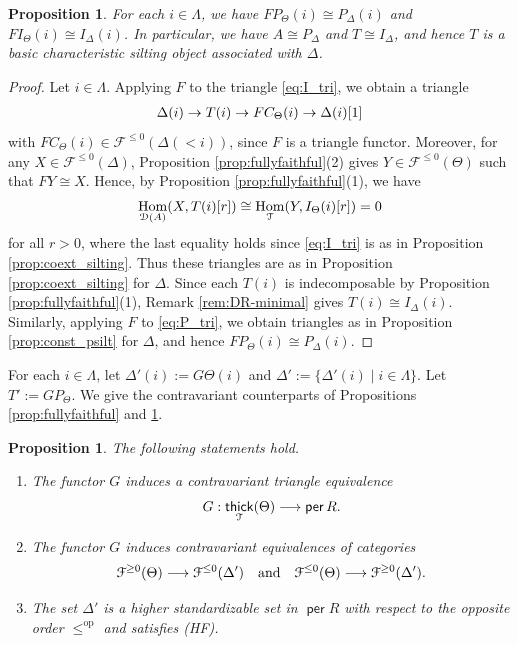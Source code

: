\documentclass[a4paper,reqno,11pt]{amsart}
\numberwithin{equation}{section}
\newtheorem{proposition}[theorem]{Proposition}
\theoremstyle{definition}
\newcommand{\D}{\mathcal{D}}
\newcommand{\F}{\mathcal{F}}
\newcommand{\T}{\mathcal{T}}
\newcommand{\bte}{\Theta}
\newcommand{\bde}{\Delta}
\newcommand{\lto}{\longrightarrow}
\newcommand{\op}{\mathrm{op}}
\DeclareMathOperator{\thick}{\mathsf{thick}}
\DeclareMathOperator{\per}{\mathsf{per}}
\DeclareMathOperator{\Hom}{Hom}
\begin{document}
\begin{proposition}\label{prop:characteristic-silting}
For each $i\in\Lambda$, we have $FP_{\bte}(i)\cong P_{\bde}(i)$ and $FI_{\bte}(i)\cong I_{\bde}(i)$.
In particular, we have $A\cong P_{\bde}$ and $T\cong I_{\bde}$, and hence $T$ is a basic characteristic silting object associated with $\bde$.
\end{proposition}
\begin{proof}
Let $i\in\Lambda$.
Applying $F$ to the triangle \eqref{eq:I_tri}, we obtain a triangle
\begin{align}
\bde(i)\to T(i)\to FC_{\bte}(i)\to\bde(i)[1]\notag
\end{align}
with $FC_{\bte}(i)\in\F^{\leq 0}(\bde(<i))$, since $F$ is a triangle functor.
Moreover, for any $X\in\F^{\leq 0}(\bde)$, Proposition \ref{prop:fullyfaithful}(2) gives $Y\in\F^{\leq 0}(\bte)$ such that $FY\cong X$.
Hence, by Proposition \ref{prop:fullyfaithful}(1), we have
\begin{align}
\Hom_{\D(A)}(X,T(i)[r]) \cong\Hom_{\T}(Y,I_{\bte}(i)[r])=0\notag
\end{align}
for all $r>0$, where the last equality holds since \eqref{eq:I_tri} is as in Proposition \ref{prop:coext_silting}.
Thus these triangles are as in Proposition \ref{prop:coext_silting} for $\bde$.
Since each $T(i)$ is indecomposable by Proposition \ref{prop:fullyfaithful}(1), Remark \ref{rem:DR-minimal} gives $T(i)\cong I_{\bde}(i)$.
Similarly, applying $F$ to \eqref{eq:P_tri}, we obtain triangles as in Proposition \ref{prop:const_psilt} for $\bde$, and hence $FP_{\bte}(i)\cong P_{\bde}(i)$.
\end{proof}

For each $i\in\Lambda$, let $\bde'(i):=G\bte(i)$ and $\bde':=\{\bde'(i)\mid i\in\Lambda\}$.
Let $T':=GP_{\bte}$.
We give the contravariant counterparts of Propositions \ref{prop:fullyfaithful} and \ref{prop:characteristic-silting}.

\begin{proposition}\label{prop:dualfullyfaithful}
The following statements hold.
\begin{enumerate}
\item The functor $G$ induces a contravariant triangle equivalence
\begin{align}
G:\thick_{\T}(\bte)\longrightarrow\per R.\notag
\end{align}
\item The functor $G$ induces contravariant equivalences of categories
\begin{align}
\F^{\geq 0}(\bte)\lto\F^{\leq 0}(\bde') \quad\text{and}\quad \F^{\leq 0}(\bte)\lto\F^{\geq 0}(\bde').\notag
\end{align}
\item The set $\bde'$ is a higher standardizable set in $\per R$ with respect to the opposite order $\leq^{\op}$ and satisfies (HF).
\end{enumerate}
\end{proposition}
\end{document}
